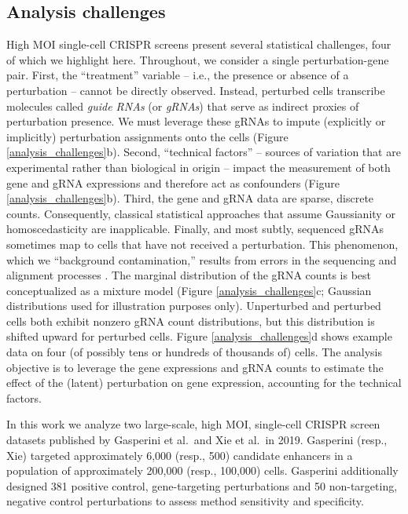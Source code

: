 \documentclass[12pt]{article}
\begin{document}
\subsection{Analysis challenges}
High MOI single-cell CRISPR screens present several statistical challenges, four of which we highlight here. Throughout, we consider a single perturbation-gene pair. First, the ``treatment'' variable -- i.e., the presence or absence of a perturbation -- cannot be directly observed. Instead, perturbed cells transcribe molecules called  \textit{guide RNAs} (or \textit{gRNAs}) that serve as indirect proxies of perturbation presence. We must leverage these gRNAs to impute (explicitly or implicitly) perturbation assignments onto the cells (Figure \ref{analysis_challenges}b). Second, ``technical factors'' -- sources of variation that are experimental rather than biological in origin -- impact the measurement of both gene and gRNA expressions and therefore act as confounders (Figure \ref{analysis_challenges}b). Third, the gene and gRNA data are sparse, discrete counts. Consequently, classical statistical approaches that assume Gaussianity or homoscedasticity are inapplicable. Finally, and most subtly, sequenced gRNAs sometimes map to cells that have not received a perturbation. This phenomenon, which we ``background contamination,'' results from errors in the sequencing and alignment processes \cite{Replogle2020}. The marginal distribution of the gRNA counts is best conceptualized as a mixture model (Figure \ref{analysis_challenges}c; Gaussian distributions used for illustration purposes only). Unperturbed and perturbed cells both exhibit nonzero gRNA count distributions, but this distribution is shifted upward for perturbed cells. Figure \ref{analysis_challenges}d shows example data on four (of possibly tens or hundreds of thousands of) cells. The analysis objective is to leverage the gene expressions and gRNA counts to estimate the effect of the (latent) perturbation on gene expression, accounting for the technical factors.

In this work we analyze two large-scale, high MOI, single-cell CRISPR screen datasets published by Gasperini et al.\ and Xie et al.\ in 2019. Gasperini (resp., Xie) targeted approximately 6,000 (resp., 500) candidate enhancers in a population of approximately 200,000 (resp., 100,000) cells. Gasperini additionally designed 381 positive control, gene-targeting perturbations and 50 non-targeting, negative control perturbations to assess method sensitivity and specificity.
\end{document}
